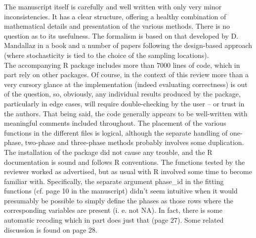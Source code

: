 \documentclass{article}
\begin{document}
The manuscript itself is carefully and well written with only very minor inconsistencies. It has a clear structure, offering a healthy combination of mathematical details and presentation of the various methods. There is no question as to its usefulness. The formalism is based on that developed by D. Mandallaz in a book and a number of papers following the design-based approach (where stochasticity is tied to the choice of the sampling locations).\\

The accompanying R package includes more than 7000 lines of code, which in part rely on other packages. Of course, in the context of this review more than a very cursory glance at the implementation (indeed evaluating correctness) is out of the question, so, obviously, any individual results produced by the package, particularly in edge cases, will require double-checking by the user – or trust in the authors. That being said, the code generally appears to be well-written with meaningful comments included throughout. The placement of the various functions in the different files is logical, although the separate handling of one-phase, two-phase and three-phase methods probably involves some duplication. The installation of the package did not cause any trouble, and the R documentation is sound and follows R conventions. The functions tested by the reviewer worked as advertised, but as usual with R involved some time to become familiar with. Specifically, the separate argument phase\_id in the fitting functions (cf. page 10 in the manuscript) didn't seem intuitive when it would presumably be possible to simply define the phases as those rows where the corresponding variables are present (i. e. not NA). In fact, there is some automatic recoding which in part does just that (page 27). Some related discussion is found on page 28.\\
\end{document}
